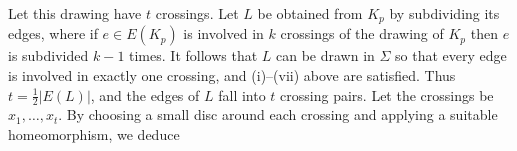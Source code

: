 Let this drawing have $t$ crossings. Let $L$ be obtained from $K_p$ by subdividing its edges, where if $e \in E(K_p)$ is involved in $k$ crossings of the drawing of $K_p$ then $e$ is subdivided $k - 1$ times. It follows that $L$ can be drawn in $\Sigma$ so that every edge is involved in exactly one crossing, and (i)--(vii) above are satisfied. Thus $t = \frac{1}{2} |E(L)|$, and the edges of $L$ fall into $t$ crossing pairs. Let the crossings be $x_1, \dots, x_t$. By choosing a small disc around each crossing and applying a suitable homeomorphism, we deduce
